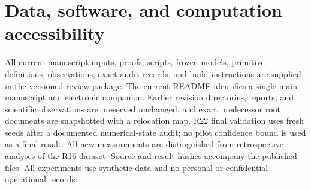 \documentclass[11pt,letterpaper]{article}
\theoremstyle{definition}
\newcommand{\1}{\mathbf 1}
\begin{document}
\section*{Data, software, and computation accessibility}
All current manuscript inputs, proofs, scripts, frozen models, primitive definitions, observations, exact audit records, and build instructions are supplied in the versioned review package. The current README identifies a single main manuscript and electronic companion. Earlier revision directories, reports, and scientific observations are preserved unchanged, and exact predecessor root documents are snapshotted with a relocation map. R22 final validation uses fresh seeds after a documented numerical-state audit; no pilot confidence bound is used as a final result. All new measurements are distinguished from retrospective analyses of the R16 dataset. Source and result hashes accompany the published files. All experiments use synthetic data and no personal or confidential operational records.
\clearpage\label{r19-reference-start}
\end{document}
